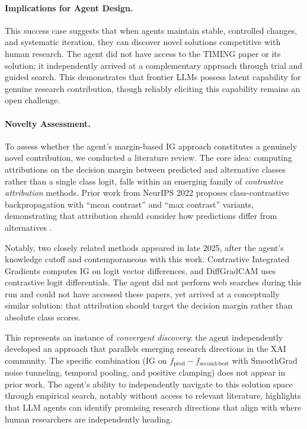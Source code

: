\documentclass[11pt]{article}
\let\cite\citep
\theoremstyle{plain}
\theoremstyle{definition}
\theoremstyle{remark}
\begin{document}

\paragraph{Implications for Agent Design.}
This success case suggests that when agents maintain stable, controlled changes, and systematic iteration, they can discover novel solutions competitive with human research. The agent did not have access to the TIMING paper or its solution; it independently arrived at a complementary approach through trial and guided search. This demonstrates that frontier LLMs possess latent capability for genuine research contribution, though reliably eliciting this capability remains an open challenge.

\paragraph{Novelty Assessment.}
To assess whether the agent's margin-based IG approach constitutes a genuinely novel contribution, we conducted a literature review. The core idea: computing attributions on the decision margin between predicted and alternative classes rather than a single class logit, falls within an emerging family of \emph{contrastive attribution} methods. Prior work from NeurIPS 2022 proposes class-contrastive backpropagation with ``mean contrast'' and ``max contrast'' variants, demonstrating that attribution should consider how predictions differ from alternatives \cite{NEURIPS2022_3b7a66b2}.

Notably, two closely related methods appeared in late 2025, after the agent's knowledge cutoff and contemporaneous with this work. Contrastive Integrated Gradients \cite{vu2025contrastiveintegratedgradientsfeature} computes IG on logit vector differences, and DiffGradCAM \cite{piland2025diffgradcamuniversalclassactivation} uses contrastive logit differentials. The agent did not perform web searches during this run and could not have accessed these papers, yet arrived at a conceptually similar solution: that attribution should target the decision margin rather than absolute class scores.

This represents an instance of \emph{convergent discovery}: the agent independently developed an approach that parallels emerging research directions in the XAI community. The specific combination (IG on $f_{\text{pred}} - f_{\text{second-best}}$ with SmoothGrad noise tunneling, temporal pooling, and positive clamping) does not appear in prior work. The agent's ability to independently navigate to this solution space through empirical search, notably without access to relevant literature, highlights that LLM agents can identify promising research directions that align with where human researchers are independently heading.
\end{document}
